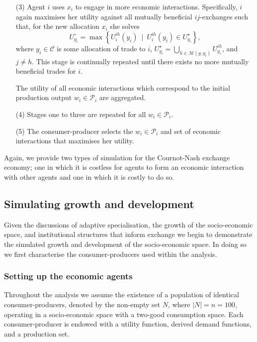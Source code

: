 \begin{algorithm}
\begin{itemize}
	\item[(3)] Agent $i$ uses $x_{i}$ to engage in more economic interactions. Specifically, $i$ again maximises her utility against all mutually beneficial $ij$-exchanges such that, for the new allocation $x_{i}$ she solves
	    \begin{equation}
	    U^{\circ}_{y_i} = \max \left\{ U^{ih}_{i}(y_{i}) ~ \mid ~ U^{ih}_{i}(y_{i}) \in U^{\star}_{y_i} \right\} ,
	    \end{equation}
	    where $y_{i} \in \mathcal{C}$ is some allocation of trade to $i$, $U^{\star}_{y_i} = \bigcup_{h \in \mathcal{M}(g,y_{i})} U^{ih}_{y_i}$, and $j \neq h$. This stage is continually repeated until there exists no more mutually beneficial trades for $i$.

	    The utility of all economic interactions which correspond to the initial production output $w_{i} \in \mathcal{P}_{i}$ are aggregated.

	\item[(4)] Stages one to three are repeated for all $w_{i} \in \mathcal{P}_{i}$.

	\item[(5)] The consumer-producer selects the $w_{i} \in \mathcal{P}_{i}$ and set of economic interactions that maximises her utility.
\end{itemize}
\end{algorithm}

Again, we provide two types of simulation for the Cournot-Nash exchange economy; one in which it is costless for agents to form an economic interaction with other agents and one in which it is costly to do so.

\subsection{Simulating growth and development}

Given the discussions of adaptive specialisation, the growth of the socio-economic space, and institutional structures that inform exchange we begin to demonstrate the simulated growth and development of the socio-economic space. In doing so we first characterise the consumer-producers used within the analysis.

\subsubsection{Setting up the economic agents}

Throughout the analysis we assume the existence of a population of identical consumer-producers, denoted by the non-empty set $N$, where $|N|=n=100$, operating in a socio-economic space with a two-good consumption space. Each consumer-producer is endowed with a utility function, derived demand functions, and a production set.

